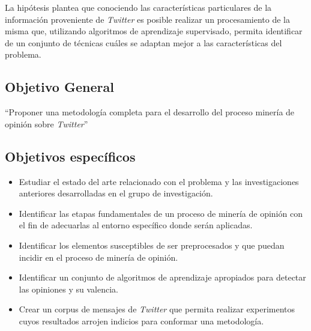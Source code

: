 \begin{introduction}
La hipótesis plantea que conociendo las características
particulares de la información proveniente de \emph{Twitter}
es posible realizar un procesamiento de la misma que,
utilizando algoritmos de aprendizaje supervisado, 
permita identificar de un conjunto de técnicas cuáles 
se adaptan mejor a las características del problema. 
  
  \subsection*{Objetivo General}
  
  ``Proponer una metodología completa para el desarrollo del proceso
minería de opinión sobre \emph{Twitter}''

  \subsection*{Objetivos específicos}
\begin{itemize}
  \item Estudiar el estado del arte relacionado con el problema
  y las investigaciones anteriores 
  desarrolladas en el grupo de investigación.
  \item Identificar las etapas fundamentales de un proceso de 
  minería de opinión con el fin de adecuarlas al entorno específico
  donde serán aplicadas.
 \item Identificar los elementos susceptibles de ser preprocesados
 y que puedan incidir en el proceso de minería de opinión.
 \item Identificar un conjunto de algoritmos de aprendizaje apropiados
 para detectar las opiniones y su valencia.
 \item Crear un corpus de mensajes de \emph{Twitter} que permita realizar 
 experimentos cuyos resultados arrojen indicios para conformar una metodología.
\end{itemize}


\end{introduction}
